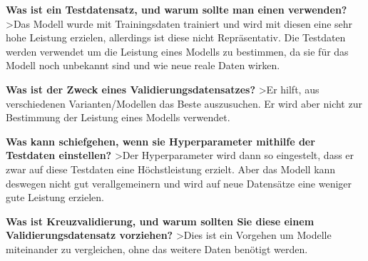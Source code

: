\documentclass[11pt]{article}
\begin{document}
\textbf{Was ist ein Testdatensatz, und warum sollte man einen
verwenden?} \textgreater{}Das Modell wurde mit Trainingsdaten trainiert
und wird mit diesen eine sehr hohe Leistung erzielen, allerdings ist
diese nicht Repräsentativ. Die Testdaten werden verwendet um die
Leistung eines Modells zu bestimmen, da sie für das Modell noch
unbekannt sind und wie neue reale Daten wirken.

\textbf{Was ist der Zweck eines Validierungsdatensatzes?}
\textgreater{}Er hilft, aus verschiedenen Varianten/Modellen das Beste
auszusuchen. Er wird aber nicht zur Bestimmung der Leistung eines
Modells verwendet.

\textbf{Was kann schiefgehen, wenn sie Hyperparameter mithilfe der
Testdaten einstellen?} \textgreater{}Der Hyperparameter wird dann so
eingestelt, dass er zwar auf diese Testdaten eine Höchstleistung
erzielt. Aber das Modell kann deswegen nicht gut verallgemeinern und
wird auf neue Datensätze eine weniger gute Leistung erzielen.

\textbf{Was ist Kreuzvalidierung, und warum sollten Sie diese einem
Validierungsdatensatz vorziehen?} \textgreater{}Dies ist ein Vorgehen um
Modelle miteinander zu vergleichen, ohne das weitere Daten benötigt
werden.


    
    
    
    
\end{document}
